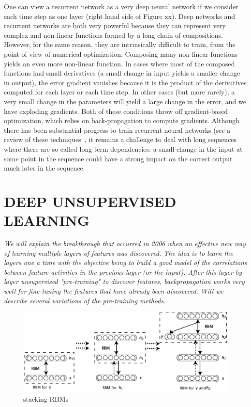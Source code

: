 \documentclass[11pt]{article} %
\begin{document}
One can view a recurrent network as a very deep neural network if we
consider each time step as one layer (right hand side of Figure xx). Deep
networks and recurrent networks are both very powerful because they can
represent very complex and non-linear functions formed by a long chain of
compositions. However, for the same reason, they are intrinsically
difficult to train, from the point of view of numerical
optimization. Composing many non-linear functions yields an even more
non-linear function. In cases where most of the composed functions had
small derivatives (a small change in input yields a smaller change in
output), the error gradient vanishes because it is the product of the
derivatives computed for each layer or each time step. In other cases (but
more rarely), a very small change in the parameters will yield a large
change in the error, and we have exploding gradients. Both of these
conditions throw off gradient-based optimization, which relies on
back-propagation to compute gradients. Although there has been substantial
progress to train recurrent neural networks (see a review of these
techniques~\citep{Pascanu+al-ICML2013-small}, it remains a challenge to deal with long
sequences where there are so-called long-term dependencies: a small change
in the input at some point in the sequence could have a strong impact on
the correct output much later in the sequence.


\section{DEEP UNSUPERVISED LEARNING}

{\em
We will explain the breakthrough that occurred in 2006 when an effective
 new way of learning multiple layers of features was discovered. The idea
 is to learn the layers one a time with the objective being to build a good
 model of the correlations between feature activities in the previous layer
 (or the input).  After this layer-by-layer unsupervised "pre-training" to
 discover features, backpropagation works very well for fine-tuning the
 features that have already been discovered.  Will we describe several
 variations of the pre-training methods.
}

\begin{figure}[H]
\centerline{\includegraphics[width=0.7\linewidth]{stacked-rbms.png}}
\caption{stacking RBMs}
\end{figure}
\end{document}
